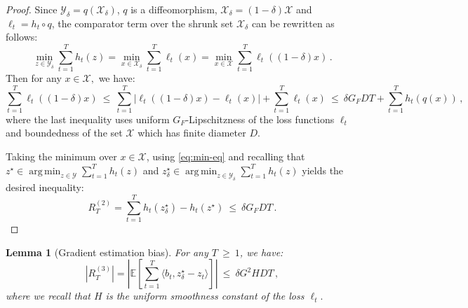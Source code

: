 \documentclass[a4paper,11pt,fullpage]{article}
\def\X{{\mathcal X}}
\def\Y{{\mathcal Y}}
\theoremstyle{plain}
\newtheorem{lemma}{Lemma}
\theoremstyle{definition}
\theoremstyle{plain}
\DeclareMathOperator*{\argmin}{arg\,min}
\renewcommand{\leq}{~\le~}
\renewcommand{\geq}{~\ge~}
\begin{document}
\begin{proof}
Since $\Y_{\delta} = q(\X_{\delta})$, $q$ is a diffeomorphism,  $\X_{\delta} = (1-\delta) \X$ and $\ell_t = h_t \circ q$, the comparator term over the shrunk set $\X_{\delta}$ can be rewritten as follows: 
\begin{equation}
\label{eq:min-eq}
\min_{z \in \Y_{\delta}} \sum_{t=1}^T h_t(z) = \min_{x \in \X_{\delta}} \sum_{t=1}^T \ell_t(x) = \min_{x \in \X} \sum_{t=1}^T \ell_t((1-\delta) x)\,.
\end{equation}
Then for any $x \in \X,$ we have: 
\begin{equation*}
\sum_{t=1}^T \ell_t((1-\delta)x)
\leq \sum_{t=1}^T |\ell_t((1-\delta)x) - \ell_t(x)| + \sum_{t=1}^T \ell_t(x) \leq \delta G_F DT + \sum_{t=1}^T h_t(q(x))\,,
\end{equation*}
where the last inequality uses uniform $G_F$-Lipschitzness of the loss functions $\ell_t$ and boundedness of the set $\X$ which has finite diameter $D$. 

Taking the minimum over $x \in \X$, using \eqref{eq:min-eq} and recalling that $z^{\star} \in \argmin_{z \in \Y} \sum_{t=1}^T h_t(z)$ and $z^{\star}_{\delta} \in \argmin_{z \in \Y_{\delta}} \sum_{t=1}^T h_t(z)$ yields the desired inequality: 
\begin{equation*}
R_T^{(2)} = \sum_{t=1}^T h_t(z_{\delta}^{\star}) - h_t(z^{\star}) \leq \delta G_FDT\,.
\end{equation*}
\end{proof}

\begin{tcolorbox}[colframe=white!,
top=2pt,left=2pt,right=2pt,bottom=2pt]
\begin{lemma}[Gradient estimation bias]
\label{lem:grad-estimation-bias}
For any $T \geq 1$, we have: 
\begin{equation*} 
|R_T^{(3)}| = \left| \mathbb{E}\left[ \sum_{t=1}^T \langle b_t, z_{\delta}^{\star} - z_t  \rangle \right]\right|   \leq \delta G^2 H DT\,,
\end{equation*}
where we recall that $H$ is the uniform smoothness constant of the loss $\ell_t.$
\end{lemma}
\end{tcolorbox}
\end{document}
